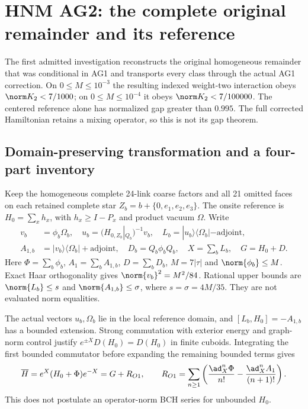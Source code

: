 \section{HNM AG2: the complete original remainder and its reference\workstar}
The first admitted investigation reconstructs the original homogeneous remainder that was conditional in AG1 and transports every class through the actual AG1 correction. On $0\le M\le10^{-3}$ the resulting indexed weight-two interaction obeys $\norm K_2<7/1000$; on $0\le M\le10^{-4}$ it obeys $\norm K_2<7/100000$. The centered reference alone has normalized gap greater than $0.995$. The full corrected Hamiltonian retains a mixing operator, so this is not its gap theorem.

\subsection{Domain-preserving transformation and a four-part inventory}
Keep the homogeneous complete 24-link coarse factors and all 21 omitted faces on each retained complete star $Z_b=b+\{0,e_1,e_2,e_3\}$. The onsite reference is $H_0=\sum_xh_x$, with $h_x\ge I-P_x$ and product vacuum $\Omega$. Write
\begin{align}
v_b&=\phi_b\Omega_b,\quad u_b=(H_{0,Z_b}|_{Q_b})^{-1}v_b,\quad
L_b=|u_b\rangle\langle\Omega_b|-\mathrm{adjoint},\nonumber\\
A_{1,b}&=|v_b\rangle\langle\Omega_b|+\mathrm{adjoint},\quad
D_b=Q_b\phi_bQ_b,\quad X=\sum_bL_b,\quad G=H_0+D.
\label{r28:ag2:linear}
\end{align}
Here $\Phi=\sum_b\phi_b$, $A_1=\sum_bA_{1,b}$, $D=\sum_bD_b$, $M=7|\tau|$ and $\norm{\phi_b}\le M$. Exact Haar orthogonality gives $\norm{v_b}^2=M^2/84$. Rational upper bounds are $\norm{L_b}\le s$ and $\norm{A_{1,b}}\le\sigma$, where $s=\sigma=4M/35$. They are not evaluated norm equalities.

The actual vectors $u_b,\Omega_b$ lie in the local reference domain, and $[L_b,H_0]=-A_{1,b}$ has a bounded extension. Strong commutation with exterior energy and graph-norm control justify $e^{\pm X}D(H_0)=D(H_0)$ in finite cuboids. Integrating the first bounded commutator before expanding the remaining bounded terms gives
\begin{equation}
\overline H=e^X(H_0+\Phi)e^{-X}=G+R_{O1},\qquad
R_{O1}=\sum_{n\ge1}\left(\frac{\ad_X^n\Phi}{n!}-\frac{\ad_X^nA_1}{(n+1)!}\right).
\label{r28:ag2:original}
\end{equation}
This does not postulate an operator-norm BCH series for unbounded $H_0$.

